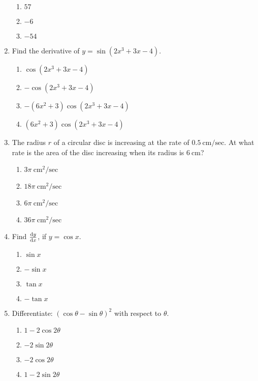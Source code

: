 \begin{multicols}{2}
\begin{enumerate}[label={\arabic*.}]
\begin{enumerate}[label={\Alph*.}]
        \item \(57\)
        \item \(-6\)
        \item \(-54\)
      \end{enumerate}
    \item Find the derivative of \(y = \sin(2{x}^{3}+3x-4)\).
      \begin{enumerate}[label={\Alph*.}]
        \item \(\cos(2{x}^{3}+3x-4)\)
        \item \(-\cos(2{x}^{3}+3x-4)\)
        \item \(-(6{x}^{2}+3)\cos(2{x}^{3}+3x-4)\)
        \item \((6{x}^{2} + 3) \cos(2{x}^{3}+3x-4)\)
      \end{enumerate}
    \item The radius \(r\) of a circular disc is increasing at the rate of \(0.5\ \text{cm/sec}\). At what rate is the area of the disc increasing when its radius is \(6\ \text{cm}\)?
      \begin{enumerate}[label={\Alph*.}]
        \item \(3\pi\ \text{cm}^2/\text{sec}\)
        \item \(18\pi\ \text{cm}^2/\text{sec}\)
        \item \(6\pi\ \text{cm}^2/\text{sec}\)
        \item \(36\pi\ \text{cm}^2/\text{sec}\)
      \end{enumerate}
    \item Find \(\frac{\mathrm{d}y}{\mathrm{d}x}\), if \(y = \cos x\).
      \begin{enumerate}[label={\Alph*.}]
        \item  \(\sin x\)
        \item  \(-\sin x\)
        \item  \(\tan x\)
        \item  \(-\tan x\)
      \end{enumerate}
    \item Differentiate: \({(\cos \theta - \sin \theta)}^2\) with respect to \(\theta\).
      \begin{enumerate}[label={\Alph*.}]
        \item  \(1-2\cos 2\theta\)
        \item  \(-2\sin 2\theta\)
        \item  \(-2\cos 2\theta\)
        \item  \(1-2\sin 2\theta\)
      \end{enumerate}

\end{enumerate}
\end{multicols}
